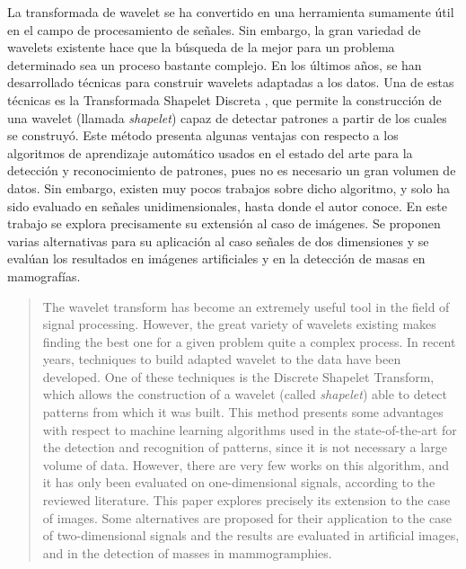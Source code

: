 \begin{resumen}
	La transformada de wavelet se ha convertido en una herramienta sumamente útil en el campo de procesamiento
	de señales. Sin embargo, la gran variedad de wavelets existente hace que la búsqueda de la mejor para 
	un problema determinado sea un proceso bastante complejo. En los últimos años, se han desarrollado
	técnicas para construir wavelets
	adaptadas a los datos. Una de estas técnicas es la Transformada Shapelet Discreta , que
	permite la construcción de una wavelet (llamada \textit{shapelet}) capaz de detectar patrones a partir de los cuales
	se construyó. Este método presenta algunas ventajas con respecto a los algoritmos de aprendizaje automático 
	usados en el estado del 
	arte para la detección y reconocimiento de patrones, pues no es necesario un gran volumen de datos. Sin embargo,
	existen muy pocos trabajos sobre dicho algoritmo, y solo ha sido evaluado en señales unidimensionales, hasta 
	donde el autor conoce. En este
	trabajo se explora precisamente su extensión al caso de imágenes. Se proponen varias alternativas para su aplicación
	al caso señales de dos dimensiones y se evalúan los resultados en imágenes artificiales y en la detección de masas en mamografías.
\end{resumen}

\begin{abstract}
	The wavelet transform has become an extremely useful tool
	in the field of signal processing. However, the great variety of wavelets
	existing makes finding the best one for a given problem
	quite a complex process. In recent years, techniques to build 
	adapted wavelet to the data have been developed. One of these techniques is the 
	Discrete Shapelet Transform, which allows the construction of a wavelet (called \textit{shapelet})
	able to detect patterns from which it was built. This method presents
	some advantages with respect to machine learning algorithms used in the state-of-the-art 
	for the detection and recognition of patterns, since it is not necessary a large volume
	of data. However, there are very few works on this algorithm, and it has only
	been evaluated on one-dimensional signals, according to the reviewed literature. 
	This paper explores precisely
	its extension to the case of images. Some alternatives are proposed for their application to the case of
	two-dimensional signals and the results are evaluated in artificial images, and in the
	detection of masses in mammogramphies.
\end{abstract}
